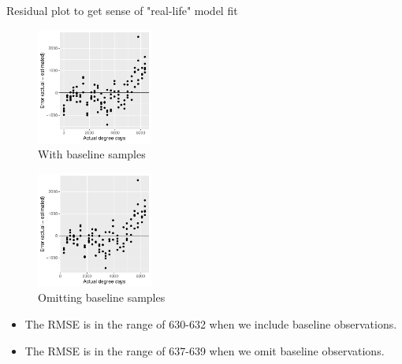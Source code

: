 \documentclass{beamer}
\begin{document}
\begin{frame}{Residual plot to get sense of "real-life" model fit}

  \begin{minipage}{0.47\textwidth}
  \begin{figure}
      \includegraphics[width=1.5in]{RiceRivers/bacteria/use_families/w_scapulae/w_baseline/leave_out_one_scapula_and_one_day_residuals}
      \caption{With baseline samples}
  \end{figure}
  \end{minipage}  
  \begin{minipage}{0.47\textwidth}
  \begin{figure}
      \includegraphics[width=1.5in]{RiceRivers/bacteria/use_families/w_scapulae/no_baseline/leave_out_one_scap_and_one_day_residuals}
      \caption{Omitting baseline samples}
  \end{figure}
  \end{minipage}
    \vspace{0.1in}
{\scriptsize
\begin{itemize}
\item The RMSE is in the range of 630-632 when we include baseline observations.
\item The RMSE is in the range of 637-639 when we omit baseline observations.
\end{itemize}
}

\end{frame}
\end{document}
